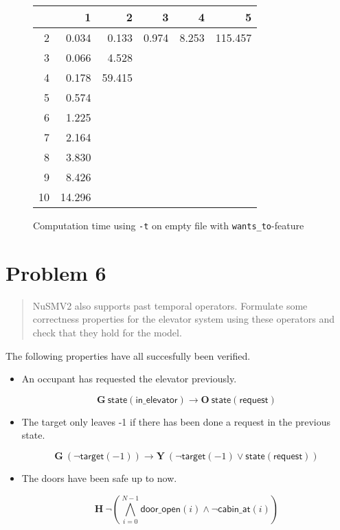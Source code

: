 \documentclass[a4paper,10pt]{article}
\newcommand{\LTLG}{\mathbf{G~}}
\newcommand{\LTLO}{\mathbf{O~}}
\newcommand{\LTLY}{\mathbf{Y~}}
\newcommand{\LTLH}{\mathbf{H~}}
\newcommand{\conjall}[2]{\mathop{\bigwedge}\limits_{#1}^{#2}}
\newcommand{\dooropen}[1]{\mathsf{door\_open}(#1)}
\newcommand{\cabinat}[1]{\mathsf{cabin\_at}(#1)}
\newcommand{\target}[1]{\mathsf{target}(#1)}
\newcommand{\state}[1]{\mathsf{state}(\mathsf{#1})}
\newcommand{\imply}{\rightarrow}
\begin{document}
	\begin{figure}[H]
		\begin{center}
			\begin{tabular}{r|r|r|r|r|r}
				\backslashbox{$F$}{$n$} & 1 & 2 & 3 & 4 & 5 \\ \hline
				2	& 0.034		& 0.133		& 0.974		& 8.253		& 115.457	\\ \hline
				3	& 0.066		& 4.528		& 			& 			&			\\ \hline
				4	& 0.178		& 59.415	& 			&			&			\\ \hline
				5	& 0.574		&			&			&			&			\\ \hline
				6	& 1.225		&			&			&			&			\\ \hline 
				7	& 2.164		&			&			&			&			\\ \hline
				8	& 3.830		&			&			&			&			\\ \hline
				9	& 8.426		&			&			&			&			\\ \hline
				10	& 14.296	&			&			&			&			\\ \hline
			\end{tabular}
		\end{center}
		
		\caption{Computation time using \texttt{-t} on empty file with \texttt{wants\_to}-feature}
	\end{figure}
	
	
	\section{Problem 6}
	
	\begin{quote}
		NuSMV2 also supports past temporal operators. Formulate some correctness properties for the elevator system using these operators and check that they hold for the model.
	\end{quote}
	
	The following properties have all succesfully been verified.
	
	\begin{itemize}
		\item
			An occupant has requested the elevator previously.
		
			\[
				\LTLG \state{in\_elevator} \imply \LTLO \state{request}
			\]
		
		\item
			The target only leaves -1 if there has been done a request in the previous state.
			
			\[
				\LTLG (\neg \target{-1}) \imply \LTLY (\neg \target{-1} \vee \state{request})
			\]
		
		\item
			The doors have been safe up to now.
			
			\[
				\LTLH \neg \left( \conjall{i=0}{N-1} \dooropen{i} \wedge \neg \cabinat{i} \right)
			\]
	\end{itemize}
	
\end{document}
